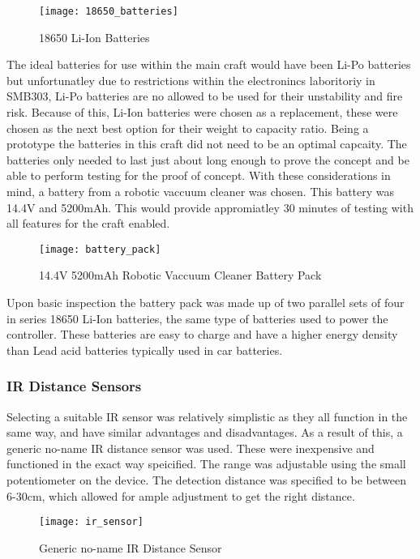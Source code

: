 \documentclass [11pt]{article}
\begin{document}
\begin{figure}[H]
\centerline{\texttt{[image: 18650\_batteries]}}
\caption{18650 Li-Ion Batteries}
\label{fig:18650_batteries}
\end{figure}

The ideal batteries for use within the main craft would have been Li-Po batteries but unfortunatley due to restrictions within the electronincs laboritoriy in SMB303, Li-Po batteries are no allowed to be used for their unstability and fire risk. Because of this, Li-Ion batteries were chosen as a replacement, these were chosen as the next best option for their weight to capacity ratio. Being a prototype the batteries in this craft did not need to be an optimal capcaity. The batteries only needed to last just about long enough to prove the concept and be able to perform testing for the proof of concept. With these considerations in mind, a battery from a robotic vaccuum cleaner was chosen. This battery was 14.4V and 5200mAh. This would provide appromiatley 30 minutes of testing with all features for the craft enabled. 

\begin{figure}[H]
\centerline{\texttt{[image: battery\_pack]}}
\caption{14.4V 5200mAh Robotic Vaccuum Cleaner Battery Pack}
\label{fig:battery_pack}
\end{figure}

Upon basic inspection the battery pack was made up of two parallel sets of four in series 18650 Li-Ion batteries, the same type of batteries used to power the controller. These batteries are easy to charge and have a higher energy density than Lead acid batteries typically used in car batteries. 

\subsubsection{IR Distance Sensors}

Selecting a suitable IR sensor was relatively simplistic as they all function in the same way, and have similar advantages and disadvantages. As a result of this, a generic no-name IR distance sensor was used. These were inexpensive and functioned in the exact way speicified. The range was adjustable using the small potentiometer on the device. The detection distance was specified to be between 6-30cm, which allowed for ample adjustment to get the right distance. 

\begin{figure}[H]
\centerline{\texttt{[image: ir\_sensor]}}
\caption{Generic no-name IR Distance Sensor}
\label{fig:ir_sensor}
\end{figure}
\end{document}
